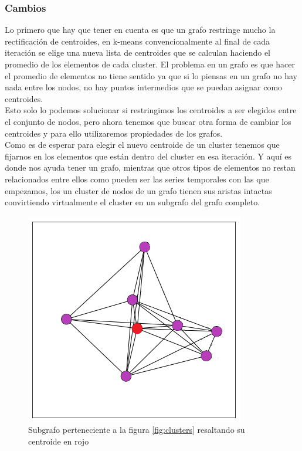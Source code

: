 \documentclass[12pt,a4paper]{article}
\begin{document}
			\subsubsection{Cambios}
			Lo primero que hay que tener en cuenta es que un grafo restringe mucho la rectificación de centroides, en k-means convencionalmente al final de cada iteración se elige una nueva lista de centroides que se calculan haciendo el promedio de los elementos de cada cluster. El problema en un grafo es que hacer el promedio de elementos no tiene sentido ya que si lo piensas en un grafo no hay nada entre los nodos, no hay puntos intermedios que se puedan asignar como centroides.\\
			Esto solo lo podemos solucionar si restringimos los centroides a ser elegidos entre el conjunto de nodos, pero ahora tenemos que buscar otra forma de cambiar los centroides y para ello utilizaremos propiedades de los grafos.\\
			Como es de esperar para elegir el nuevo centroide de un cluster tenemos que fijarnos en los elementos que están dentro del cluster en esa iteración. Y aquí es donde nos ayuda tener un grafo, mientras que otros tipos de elementos no restan relacionados entre ellos como pueden ser las series temporales con las que empezamos, los un cluster de nodos de un grafo tienen sus aristas intactas convirtiendo virtualmente el cluster en un subgrafo del grafo completo.\\
			 \begin{figure}[H]
\centering
  \centering
  \includegraphics[width=0.5\linewidth]{subgrafo}
\caption{Subgrafo perteneciente  a la figura \ref{fig:clusters} resaltando su centroide en rojo }
\label{fig:subrgrafo}
\end{figure}
			
\end{document}
